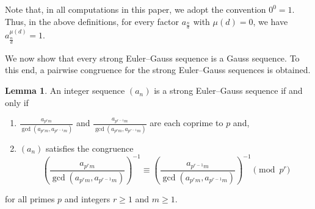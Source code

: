 \documentclass{article}
\numberwithin{equation}{section}
\theoremstyle{definition}
\newtheorem{lemma}[definition]{\bf {Lemma}}
\begin{document}
Note that, in all computations in this paper, we adopt the convention $0^0 = 1$. Thus, in the above definitions, for every factor $a_{\frac{n}{d}}$ with $\mu(d)=0$, we have $a_{\frac{n}{d}}^{\mu(d)} = 1$. 

We now show that every strong Euler--Gauss sequence is a Gauss sequence. To this end, a pairwise congruence for the strong Euler--Gauss sequences is obtained. 
\begin{lemma} \label{lem:01}
    An integer sequence $(a_n)$ is a strong Euler--Gauss sequence if and only if
    \begin{enumerate}
        \item[i.] $\frac{a_{p^rm}}{\gcd\left(a_{p^rm},a_{p^{r-1}m}\right)}$ and $\frac{a_{p^{r-1}m}}{\gcd\left(a_{p^rm},a_{p^{r-1}m}\right)}$ are each coprime to $p$ and, 
        \item[ii.] $(a_n)$ satisfies the congruence 
        \begin{equation}\label{eq:015}
        \left(\frac{a_{p^rm}}{\gcd(a_{p^rm},a_{p^{r-1}m})}\right)^{-1}\equiv\left(\frac{a_{p^{r-1}m}}{\gcd(a_{p^rm},a_{p^{r-1}m})}\right)^{-1}\pmod{p^r}
        \end{equation}
    \end{enumerate}
    for all primes $p$ and integers $r\geq1$ and $m\geq1$.
\end{lemma}
\end{document}
